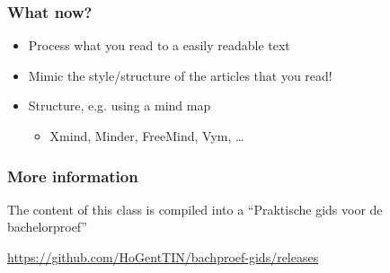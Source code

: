 \documentclass[aspectratio=169]{beamer}
\begin{document}
\begin{frame}
  \frametitle{What now?}

  \begin{itemize}
    \item Process what you read to a easily readable text
    \item Mimic the style/structure of the articles that you read!
    \item Structure, e.g. using a mind map
      \begin{itemize}
        \item Xmind, Minder, FreeMind, Vym, \ldots
      \end{itemize}
  \end{itemize}
\end{frame}

\begin{frame}
  \frametitle{More information}

  The content of this class is compiled into a ``Praktische gids voor de bachelorproef''

  \vspace{12pt}

  \url{https://github.com/HoGentTIN/bachproef-gids/releases}

\end{frame}

\end{document}
